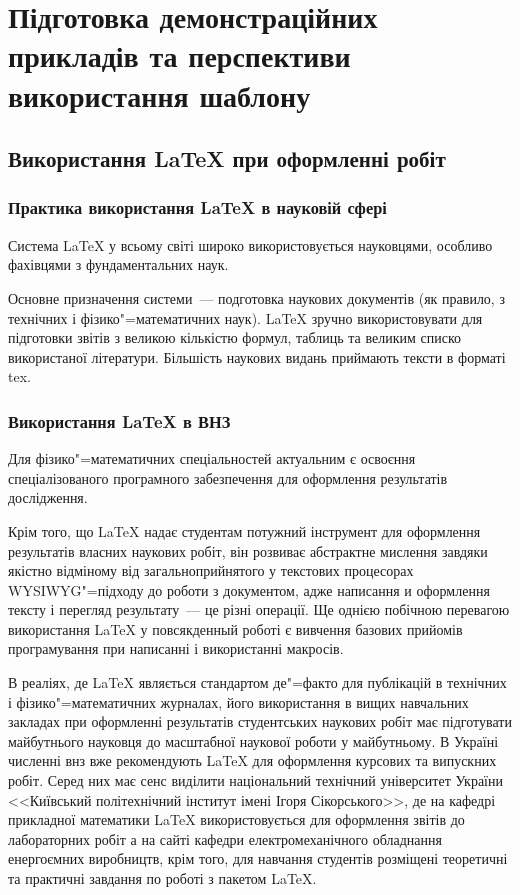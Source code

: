 \chapter{Підготовка демонстраційних прикладів та перспективи використання шаблону} 
\label{chap:first}

\section{Використання \LaTeX{} при оформленні робіт}

\subsection{Практика використання \LaTeX{} в науковій сфері}

Система \LaTeX{} у всьому світі широко використовується науковцями, особливо фахівцями з фундаментальних наук.

Основне призначення системи~--- подготовка наукових документів (як правило, з технічних і фізико"=математичних наук). \LaTeX{} зручно використовувати для підготовки звітів з великою кількістю формул, таблиць та великим списко використаної літератури. Більшість наукових видань приймають тексти в форматі tex.

\subsection{Використання \LaTeX{} в ВНЗ}

Для фізико"=математичних спеціальностей актуальним є освоєння спеціалізованого програмного забезпечення для оформлення результатів дослідження. 

Крім того, що \LaTeX{} надає студентам потужний інструмент для оформлення результатів власних наукових робіт, він розвиває абстрактне мислення завдяки якістно відміному від загальноприйнятого у текстових процесорах WYSIWYG"=підходу до роботи з документом, адже написання и оформлення тексту і перегляд результату~--- це різні операції. Ще однією побічною перевагою використання \LaTeX{} у повсякденный роботі є вивчення базових прийомів програмування при написанні і використанні макросів.

В реаліях, де \LaTeX{} являється стандартом де"=факто для публікацій в технічних і фізико"=математичних журналах, його використання в вищих навчальних закладах при оформленні результатів студентських наукових робіт має підготувати майбутнього науковця до масштабної наукової роботи у майбутньому. В Україні численні внз вже рекомендують \LaTeX{} для оформлення курсових та випускних робіт. Серед них має сенс виділити національний технічний університет України <<Київський політехнічний інститут імені Ігоря Сікорського>>, де на кафедрі прикладної математики \LaTeX{} використовується для оформлення звітів до лабораторних робіт а на сайті кафедри електромеханічного обладнання енергоємних виробництв, крім того, для навчання студентів розміщені теоретичні та практичні завдання по роботі з пакетом \LaTeX{}.

